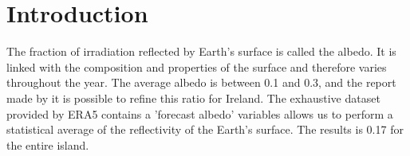 \chapter{Introduction}

The fraction of irradiation reflected by Earth's surface is called the albedo. It is linked with the composition and properties of the surface and therefore varies throughout the year. The average albedo is between 0.1 and 0.3, and the report made by \citep{garciaclimate} it is possible to refine this ratio for Ireland. The exhaustive dataset provided by ERA5 contains a 'forecast albedo' variables \citep{hersbach2020era5} allows us to perform a statistical average of the reflectivity of the Earth's surface. The results is 0.17 for the entire island.